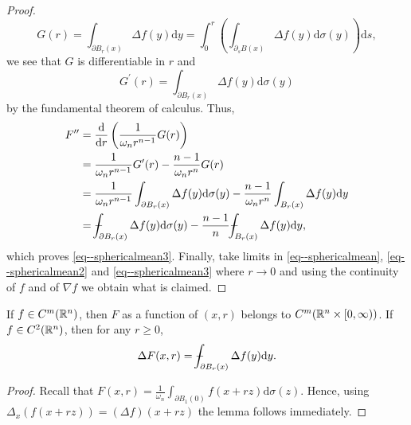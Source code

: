 \documentclass[11pt]{article}
\begin{document}
\begin{proof}
					\begin{equation*}
						G(r)=\int_{\partial B_r(x)}\Delta f(y)\mathrm{d}y=\int_0^r\left(\int_{\partial_s B(x)}\Delta f(y)\mathrm{d}\sigma(y)\right)\mathrm{d}s,
					\end{equation*}
					we see that $G$ is differentiable in $r$ and
					\begin{equation*}
						G^\prime(r)=\int_{\partial B_r(x)}\Delta f(y)\mathrm{d}\sigma(y)
					\end{equation*}
					by the fundamental theorem of calculus. Thus,
					\begin{align*}
						F^{\prime\prime}&=\frac{\mathrm{d}}{\mathrm{d}r}\left(\frac{1}{\omega_nr^{n-1}}G(r)\right)\\
						&=\frac{1}{\omega_nr^{n-1}}G^\prime(r)-\frac{n-1}{\omega_nr^n}G(r)\\
						&=\frac{1}{\omega_nr^{n-1}}\int_{\partial B_r(x)}\Delta f(y)\mathrm{d}\sigma(y)-\frac{n-1}{\omega_nr^n}\int_{B_r(x)}\Delta f(y)\mathrm{d}y\\
						&=\dashint_{\partial B_r(x)}\Delta f(y)\mathrm{d}\sigma(y)-\frac{n-1}{n}\dashint_{B_r(x)}\Delta f(y)\mathrm{d}y,
					\end{align*}
					which proves \eqref{eq--sphericalmean3}. Finally, take limits in \eqref{eq--sphericalmean}, \eqref{eq--sphericalmean2} and \eqref{eq--sphericalmean3} where $r\to0$ and using the continuity of $f$ and of $\nabla f$ we obtain what is claimed.
				\end{proof}

				\begin{lemma}
					If $f\in C^m(\mathbb{R}^n)$, then $F$ as a function of $(x,r)$ belongs to $C^m(\mathbb{R}^n\times[0,\infty))$. If $f\in C^2(\mathbb{R}^n)$, then for any $r\ge0$,
					\begin{equation*}
						\Delta F(x,r)=\dashint_{\partial B_r(x)}\Delta f(y)\mathrm{d}y.
					\end{equation*}
				\end{lemma}
				\begin{proof}
					Recall that $F(x,r)=\frac{1}{\omega_n}\int_{\partial B_1(0)}f(x+rz)\mathrm{d}\sigma(z)$. Hence, using $\Delta_x(f(x+rz))=(\Delta f)(x+rz)$ the lemma follows immediately.
				\end{proof}
\end{document}
